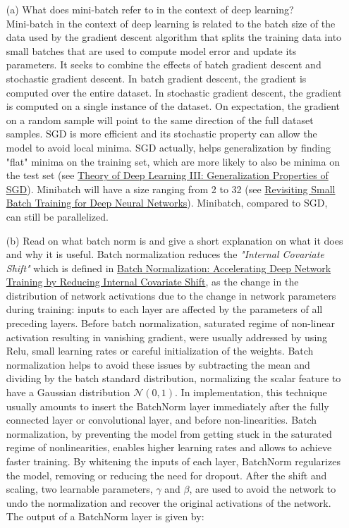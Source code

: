 \documentclass[11pt]{article}
\newcommand{\0}{\mat{0}}
\begin{document}
\begin{itemize}
    \item[(a)]   What does mini-batch refer to in the context of deep learning?\\
    Mini-batch in the context of deep learning is related to the batch size of the data used by the gradient descent algorithm that splits the training
    data into small batches that are used to compute model error and update its parameters. It seeks to combine the effects of batch gradient descent and stochastic gradient descent.
    In batch gradient descent, the gradient is computed over the entire dataset. In stochastic gradient descent, the gradient is computed on a single instance of the dataset. On expectation, the gradient on a random sample will point to the same direction of the full dataset samples. SGD is more efficient and its stochastic property  can allow the model to avoid local minima.  SGD actually, helps generalization by finding "flat" minima on the training set, which are more likely to also be minima on the test set (see \href{https://cbmm.mit.edu/sites/default/files/publications/CBMM-Memo-067.pdf}{Theory of Deep Learning III: Generalization Properties of SGD}). Minibatch will have a size ranging from 2 to 32 (see \href{https://arxiv.org/abs/1804.07612}{Revisiting Small Batch Training for Deep Neural Networks}). Minibatch, compared to SGD, can still be parallelized.
    \item[(b)] Read on what batch norm is and give a short explanation on what it does and why it is useful.
    Batch normalization reduces the \textit{"Internal Covariate Shift"} which is defined in \href{https://arxiv.org/abs/1502.03167}{Batch Normalization: Accelerating Deep Network Training by Reducing Internal Covariate Shift}, as the change in the distribution of network activations due to the change in network parameters during training: inputs to each layer are affected by the parameters of all preceding layers. Before batch normalization, saturated regime of non-linear activation resulting in vanishing gradient, were usually addressed by using Relu, small learning rates or careful initialization of the weights. Batch normalization helps to avoid these issues by subtracting the mean and dividing by the batch standard distribution, normalizing the scalar feature to have a Gaussian distribution $\mathcal{N}(0,1)$.  In implementation, this technique usually amounts to insert the BatchNorm layer immediately after the fully connected layer or convolutional layer, and before non-linearities. Batch normalization, by preventing the model from getting stuck in the saturated regime of nonlinearities, enables higher learning rates and allows to achieve faster training. By whitening the inputs of  each layer, BatchNorm regularizes the model, removing or reducing the need for dropout. After the shift and scaling, two learnable parameters, $\gamma$ and $\beta$, are used to avoid the network to undo the normalization and recover the original activations  of the network. The output of a BatchNorm layer is given by:

\end{itemize}
\end{document}
